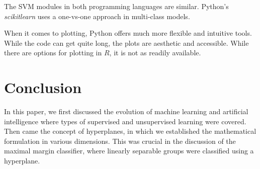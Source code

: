 \documentclass[12pt]{article}
\begin{document}
The SVM modules in both programming languages are similar. Python's \textit{scikitlearn} uses a one-vs-one approach in multi-class models.

When it comes to plotting, Python offers much more flexible and intuitive tools. While the code can get quite long, the plots are aesthetic and accessible. While there are options for plotting in $R$, it is not as readily available.

\section{Conclusion}
In this paper, we first discussed the evolution of machine learning and artificial intelligence where types of supervised and unsupervised learning were covered. Then came the concept of hyperplanes, in which we established the mathematical formulation in various dimensions. This was crucial in the discussion of the maximal margin classifier, where linearly separable groups were classified using a hyperplane. 

\newpage
\thispagestyle{empty}


\end{document}
